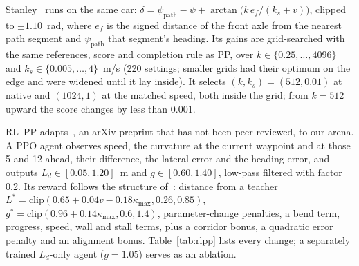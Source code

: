 \documentclass[10pt,twocolumn,twoside]{article}
\newcommand{\Ld}{L_d}
\begin{document}
Stanley~\cite{hoffmann2007} runs on the same car:
$\delta=\psi_{\mathrm{path}}-\psi+\arctan\big(k\,e_f/(k_s+v)\big)$, clipped to
$\pm1.10$~rad, where $e_f$ is the signed distance of the front axle from the
nearest path segment and $\psi_{\mathrm{path}}$ that segment's heading. Its
gains are grid-searched with the same references, score and completion rule as
PP, over $k\in\{0.25,\dots,4096\}$ and $k_s\in\{0.005,\dots,4\}$~m/s (220
settings; smaller grids had their optimum on the edge and were widened until it
lay inside). It selects $(k,k_s)=(512,0.01)$ at native and $(1024,1)$ at the
matched speed, both inside the grid; from $k=512$ upward the score changes by less than
0.001.

RL--PP adapts~\cite{elgouhary2026}, an arXiv preprint that has not been peer
reviewed, to our arena. A PPO agent observes speed, the curvature at the
current waypoint and at those 5 and 12 ahead, their difference, the lateral error and the heading error, and
outputs $\Ld\in[0.05,1.20]$~m and $g\in[0.60,1.40]$, low-pass filtered with
factor 0.2. Its reward follows the structure of~\cite{elgouhary2026}: distance
from a teacher $L^{*}=\mathrm{clip}(0.65+0.04v-0.18\kappa_{\max},0.26,0.85)$,
$g^{*}=\mathrm{clip}(0.96+0.14\kappa_{\max},0.6,1.4)$, parameter-change
penalties, a bend term, progress, speed, wall and stall terms, plus a corridor
bonus, a quadratic error penalty and an alignment bonus. Table~\ref{tab:rlpp}
lists every change; a separately trained $\Ld$-only agent ($g=1.05$) serves as
an ablation.
\end{document}
